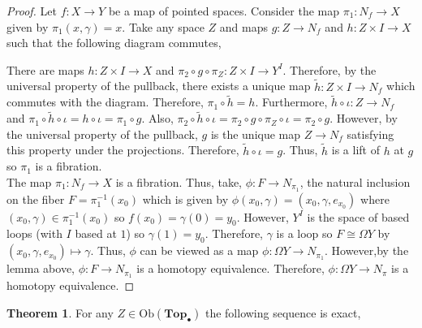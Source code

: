 \documentclass[12pt]{extarticle}
\newcommand{\Ob}[1]{\mathrm{Ob}(#1)}
\newcommand{\pTop}{\mathbf{Top}_{\bullet}}
\theoremstyle{definition}
\newtheorem{theorem}{Theorem}[section]
\begin{document}
\begin{proof}
Let $f : X \to Y$ be a map of pointed spaces. Consider the map $\pi_1 : N_f \to X$ given by $\pi_1(x, \gamma) = x$. Take any space $Z$ and maps $g : Z \to N_f$ and $h : Z \times I \to X$ such that the following diagram commutes,
\begin{center}
\end{center}
There are maps $h : Z \times I \to X$ and $\pi_2 \circ g \circ \pi_Z : Z \times I \to Y^I$. Therefore, by the universal property of the pullback, there exists a unique map $\tilde{h} : Z \times I \to N_f$ which commutes with the diagram. Therefore, $\pi_1 \circ \tilde{h} = h$. Furthermore, $\tilde{h} \circ \iota : Z \to N_f$ and $\pi_1 \circ \tilde{h} \circ \iota = h \circ \iota = \pi_1 \circ g$. Also, $\pi_2 \circ \tilde{h} \circ \iota = \pi_2 \circ g \circ \pi_Z \circ \iota = \pi_2 \circ g$. However, by the universal property of the pullback, $g$ is the unique map $Z \to N_f$ satisfying this property under the projections. Therefore, $\tilde{h} \circ \iota = g$. Thus, $\tilde{h}$ is a lift of $h$ at $g$ so $\pi_1$ is a fibration. \bigskip \\
The map $\pi_1 : N_f \to X$ is a fibration. Thus, take, $\phi : F \to N_{\pi_1}$, the natural inclusion on the fiber $F = \pi_1^{-1}(x_0)$ which is given by $\phi(x_0, \gamma) = (x_0, \gamma, e_{x_0})$ where $(x_0, \gamma) \in \pi_1^{-1}(x_0)$ so $f(x_0) = \gamma(0) = y_0$. However, $Y^I$ is the space of based loops (with $I$ based at $1$) so $\gamma(1) = y_0$. Therefore, $\gamma$ is a loop so $F \cong \Omega Y$ by $(x_0, \gamma, e_{x_0}) \mapsto \gamma$. Thus, $\phi$ can be viewed as a map $\phi : \Omega Y \to N_{\pi_1}$. However,by the lemma above, $\phi : F \to N_{\pi_1}$ is a homotopy equivalence. Therefore, $\phi : \Omega Y \to N_\pi$ is a homotopy equivalence. 
\end{proof}

\begin{theorem} \label{homexactpuppe}
For any $Z \in \Ob{\pTop}$ the following sequence is exact,
\begin{center}
\end{center}  
\end{theorem}
\end{document}
